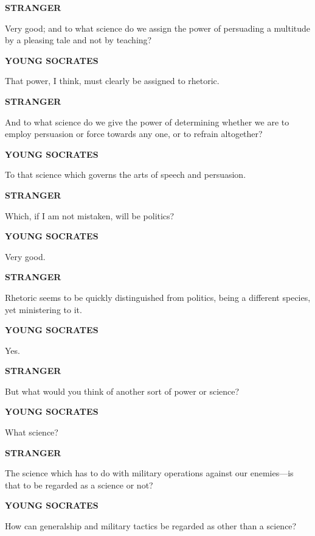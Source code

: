 \documentclass[11pt,letter]{article}
\begin{document}
\par \textbf{STRANGER}
\par   Very good; and to what science do we assign the power of persuading a multitude by a pleasing tale and not by teaching?

\par \textbf{YOUNG SOCRATES}
\par   That power, I think, must clearly be assigned to rhetoric.

\par \textbf{STRANGER}
\par   And to what science do we give the power of determining whether we are to employ persuasion or force towards any one, or to refrain altogether?

\par \textbf{YOUNG SOCRATES}
\par   To that science which governs the arts of speech and persuasion.

\par \textbf{STRANGER}
\par   Which, if I am not mistaken, will be politics?

\par \textbf{YOUNG SOCRATES}
\par   Very good.

\par \textbf{STRANGER}
\par   Rhetoric seems to be quickly distinguished from politics, being a different species, yet ministering to it.

\par \textbf{YOUNG SOCRATES}
\par   Yes.

\par \textbf{STRANGER}
\par   But what would you think of another sort of power or science?

\par \textbf{YOUNG SOCRATES}
\par   What science?

\par \textbf{STRANGER}
\par   The science which has to do with military operations against our enemies—is that to be regarded as a science or not?

\par \textbf{YOUNG SOCRATES}
\par   How can generalship and military tactics be regarded as other than a science?
\end{document}
